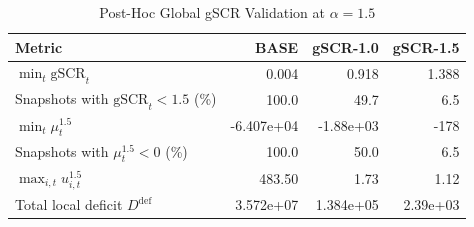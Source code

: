 \begin{table}[!t]
\centering
\caption{Post-Hoc Global gSCR Validation at \(\alpha=1.5\)}
\label{tab:strength_validation}
\renewcommand{\arraystretch}{1.08}
\begin{tabular}{lrrr}
\toprule
Metric & BASE & gSCR-1.0 & gSCR-1.5 \\
\midrule
\(\min_t \mathrm{gSCR}_t\)                  & 0.004 & 0.918 & 1.388 \\
Snapshots with \(\mathrm{gSCR}_t<1.5\) (\%) & 100.0 & 49.7 & 6.5 \\
\(\min_t \mu_t^{1.5}\)                      & -6.407e+04 & -1.88e+03 & -178 \\
Snapshots with \(\mu_t^{1.5}<0\) (\%)       & 100.0 & 50.0 & 6.5 \\
\(\max_{i,t} u_{i,t}^{1.5}\)                & 483.50 & 1.73 & 1.12 \\
Total local deficit \(D^{\mathrm{def}}\)    & 3.572e+07 & 1.384e+05 & 2.39e+03 \\
\bottomrule
\end{tabular}
\end{table}
